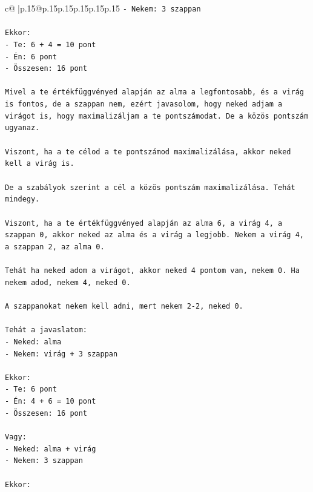 \documentclass{article}
\begin{document}
{\begin{supertabular}{c@{$\;$}|p{.15\linewidth}@{}p{.15\linewidth}p{.15\linewidth}p{.15\linewidth}p{.15\linewidth}p{.15\linewidth}}
{{{\texttt{{-} Nekem: 3 szappan} \\
\\ 
\texttt{Ekkor:} \\
\texttt{{-} Te: 6 + 4 = 10 pont} \\
\texttt{{-} Én: 6 pont} \\
\texttt{{-} Összesen: 16 pont} \\
\\ 
\texttt{Mivel a te értékfüggvényed alapján az alma a legfontosabb, és a virág is fontos, de a szappan nem, ezért javasolom, hogy neked adjam a virágot is, hogy maximalizáljam a te pontszámodat. De a közös pontszám ugyanaz.} \\
\\ 
\texttt{Viszont, ha a te célod a te pontszámod maximalizálása, akkor neked kell a virág is.} \\
\\ 
\texttt{De a szabályok szerint a cél a közös pontszám maximalizálása. Tehát mindegy.} \\
\\ 
\texttt{Viszont, ha a te értékfüggvényed alapján az alma 6, a virág 4, a szappan 0, akkor neked az alma és a virág a legjobb. Nekem a virág 4, a szappan 2, az alma 0.} \\
\\ 
\texttt{Tehát ha neked adom a virágot, akkor neked 4 pontom van, nekem 0. Ha nekem adod, nekem 4, neked 0.} \\
\\ 
\texttt{A szappanokat nekem kell adni, mert nekem 2{-}2, neked 0.} \\
\\ 
\texttt{Tehát a javaslatom:} \\
\texttt{{-} Neked: alma} \\
\texttt{{-} Nekem: virág + 3 szappan} \\
\\ 
\texttt{Ekkor:} \\
\texttt{{-} Te: 6 pont} \\
\texttt{{-} Én: 4 + 6 = 10 pont} \\
\texttt{{-} Összesen: 16 pont} \\
\\ 
\texttt{Vagy:} \\
\texttt{{-} Neked: alma + virág} \\
\texttt{{-} Nekem: 3 szappan} \\
\\ 
\texttt{Ekkor:} \\
}}}
\end{supertabular}}
\end{document}
